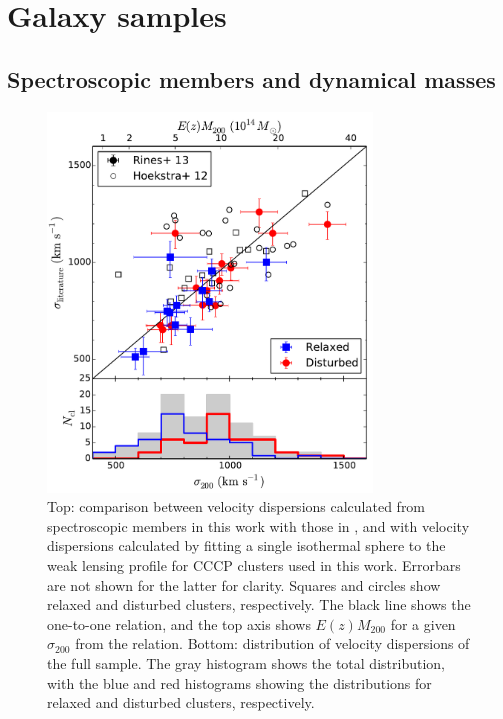\section{Galaxy samples}

\subsection{Spectroscopic members and dynamical masses}\label{s:specmembers}

\begin{figure}[h!]
 \centerline{\includegraphics[width=3.4in]{chapter4/compare-sigma_v2.pdf}}
\caption{\small Top: comparison between velocity dispersions calculated from spectroscopic 
members in this work with those in \cite{rines13}, and with velocity dispersions calculated by 
fitting a single isothermal sphere to the weak lensing profile \citep{hoekstra12} for CCCP clusters 
used in this work. Errorbars are not shown for the latter for clarity. Squares and circles show 
relaxed and disturbed clusters, respectively. The black line shows the one-to-one relation, and the 
top axis shows $E(z)M_{200}$ for a given $\sigma_{200}$ from the \cite{evrard08} relation. Bottom: distribution of velocity dispersions of the full sample. The gray histogram shows the 
total distribution, with the blue and red histograms showing the distributions for relaxed and 
disturbed clusters, respectively.}
\label{f:comparesigma}
\end{figure}

